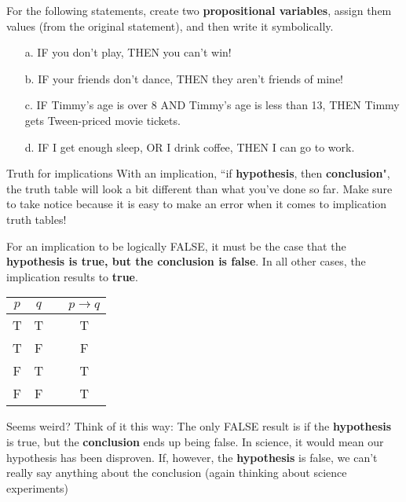     \begin{questionNOGRADE}{\thequestion}
        For the following statements, create two
        \textbf{propositional variables}, assign them values (from
        the original statement), and then write it symbolically.

        \begin{enumerate}
            \item[a.] IF you don't play, THEN you can't win!
            \item[b.] IF your friends don't dance, THEN they aren't friends of mine!
            \item[c.] IF Timmy's age is over 8 AND Timmy's age is less than 13, THEN Timmy gets Tween-priced movie tickets.
            \item[d.] IF I get enough sleep, OR I drink coffee, THEN I can go to work.
        \end{enumerate}        
    \end{questionNOGRADE}

    \newpage

        \begin{intro}{Truth for implications}
            With an implication, ``if \textbf{hypothesis}, then \textbf{conclusion}",
            the truth table will look a bit different than what you've done so far.
            Make sure to take notice because it is easy to make an error when it
            comes to implication truth tables!

            For an implication to be logically FALSE, it must be the case that
            the \textbf{hypothesis is true, but the conclusion is false}. In
            all other cases, the implication results to \textbf{true}.

            \begin{center}
                \begin{tabular}{| c | c | c | c |}
                    \hline{}
                    $p$ & $q$ & & $p \to q$
                    \\ \hline
                    T & T & & T
                    \\ \hline

                    T & F & & F
                    \\ \hline

                    F & T & & T
                    \\ \hline

                    F & F & & T
                    \\ \hline
                \end{tabular}
            \end{center}

            Seems weird? Think of it this way: The only FALSE result is if
            the \textbf{hypothesis} is true, but the \textbf{conclusion}
            ends up being false. In science, it would mean our hypothesis
            has been disproven. If, however, the \textbf{hypothesis}
            is false, we can't really say anything about the conclusion
            (again thinking about science experiments)
        \end{intro}


